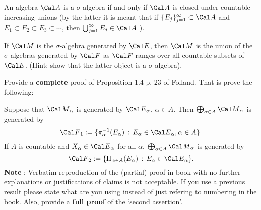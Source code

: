 \endproclaim


 An algebra $\Cal A$ is a $\sigma$-algebra if and only if $\Cal A$ is closed under countable increasing unions
(by the latter it is meant that if $\{E_j\}_{j=1}^{\infty} \subset {\Cal A}$ and 
$E_1 \subset E_2 \subset E_3 \subset \cdots $, then $\bigcup_{j=1}^{\infty} E_j \in {\Cal A} $ ).  


\endproclaim 

  If $ {\Cal M}$ is the $\sigma$-algebra generated by $\Cal E$, then $\Cal M$ is the union of the $\sigma$-algebras generated by $\Cal F$ as $\Cal F$ ranges over all countable subsets of $\Cal E$. (Hint: show that the latter object is a $\sigma$-algebra). 

\endproclaim


 Provide a {\bf complete} proof of Proposition 1.4 p. 23 of Folland. That is prove the following:

Suppose that ${\Cal M}_{\alpha}$ is generated by ${\Cal E}_{\alpha}$, $\alpha \in A$. Then $\bigoplus_{\alpha \in A} {\Cal M}_{\alpha}$ is generated by $$\F_1 := \{ \pi^{-1}_{\alpha} (E_{\alpha}) \, : \, E_{\alpha} \in {\Cal E}_{\alpha}, \alpha \in A \}. $$
If $A$ is countable and $X_{\alpha} \in {\Cal E}_{\alpha}$ for all $\alpha$, $\bigoplus_{\alpha \in A} {\Cal M}_{\alpha}$ is generated by 
$$\F_2 := \{ \Pi_{\alpha \in A} (E_{\alpha}) \, : \, E_{\alpha} \in {\Cal E}_{\alpha} \}. $$
\endproclaim 
{\bf Note} : Verbatim reproduction of the (partial) proof in book with no
further explanations or justifications of claims is  not
acceptable. If you use a previous result please state
 what are you using instead of just refering to
numbering in the book. Also, provide a {\bf full proof} of the `second
assertion'. 

\endproclaim 

\endproclaim 

\endproclaim 

\endproclaim 


\endproclaim 

\enddocument























